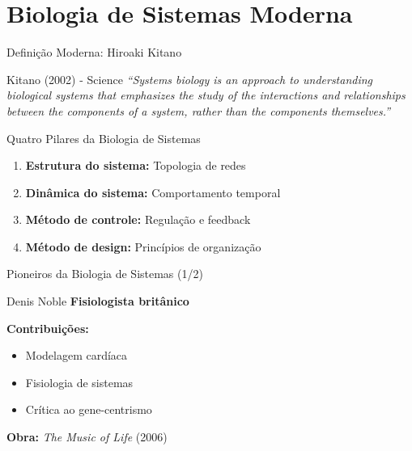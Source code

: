 \section{Biologia de Sistemas Moderna}

\begin{frame}{Definição Moderna: Hiroaki Kitano}
\begin{exampleblock}{Kitano (2002) - Science}
\textit{``Systems biology is an approach to understanding biological systems that emphasizes the study of the interactions and relationships between the components of a system, rather than the components themselves.''}
\end{exampleblock}

\vspace{0.5cm}

\begin{block}{Quatro Pilares da Biologia de Sistemas}
\begin{enumerate}
    \item \textbf{Estrutura do sistema:} Topologia de redes
    \item \textbf{Dinâmica do sistema:} Comportamento temporal
    \item \textbf{Método de controle:} Regulação e feedback
    \item \textbf{Método de design:} Princípios de organização
\end{enumerate}
\end{block}
\end{frame}

\begin{frame}{Pioneiros da Biologia de Sistemas (1/2)}
\begin{block}{Denis Noble}
\textbf{Fisiologista britânico}

\vspace{0.2cm}

\textbf{Contribuições:}
\begin{itemize}
    \item Modelagem cardíaca
    \item Fisiologia de sistemas
    \item Crítica ao gene-centrismo
\end{itemize}

\vspace{0.2cm}
\textbf{Obra:} \textit{The Music of Life} (2006)
\end{block}
\end{frame}

